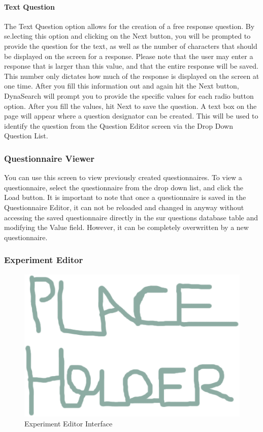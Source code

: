 \documentclass[article]{ij4uq}              %
\begin{document}
\paragraph{Text Question}
The Text Question option allows for the creation of a free response question. By se.lecting this option and clicking on the Next button, you will be prompted to provide the question for the text, as well as the number of characters that should be displayed on the screen for a response. Please note that the user may enter a response that is larger than this value, and that the entire response will be saved. This number only dictates how much of the response is displayed on the screen at one time. 
After you fill this information out and again hit the Next button, DynaSearch will prompt you to provide the specific values for each radio button option. After you fill the values, hit Next to save the question. A text box on the page will appear where a question designator can be created. This will be used to identify the question from the Question Editor screen via the Drop Down Question List.

\subsubsection{Questionnaire Viewer}
You can use this screen to view previously created questionnaires. To view a questionnaire, select the questionnaire from the drop down list, and click the Load button. 
It is important to note that once a questionnaire is saved in the Questionnaire Editor, it can not be reloaded and changed in anyway without accessing the saved questionnaire directly in the sur questions database table and modifying the Value field. However, it can be completely overwritten by a new questionnaire.

\subsubsection{Experiment Editor}

\begin{figure}[h!]
 \centering
 \includegraphics[width=5.0in]{figures/place.eps}
 \caption{Experiment Editor Interface}
 \label{fig:eeInterface}
\end{figure}
\FloatBarrier
\end{document}
